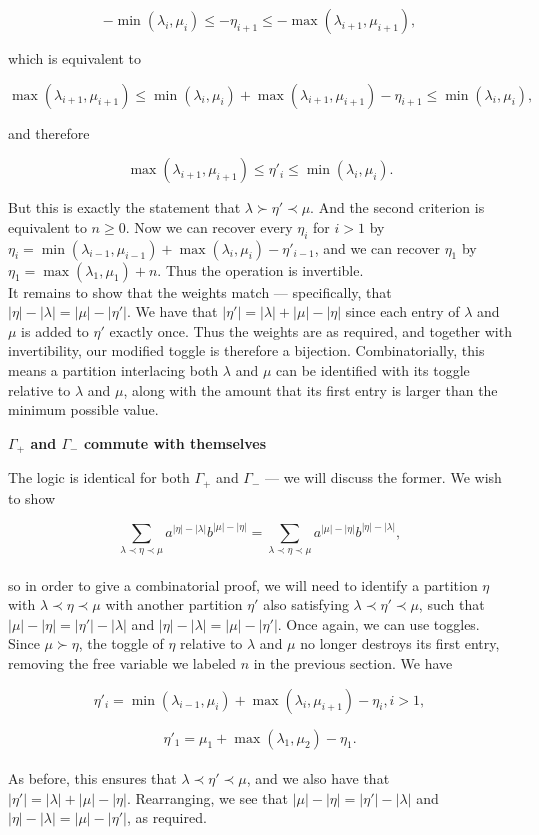 $$
	-\min(\lambda_i, \mu_i) \leq -\eta_{i + 1} \leq -\max(\lambda_{i + 1}, \mu_{i + 1}),
$$

which is equivalent to

$$
	\max(\lambda_{i + 1}, \mu_{i + 1}) \leq \min(\lambda_i, \mu_i) + \max(\lambda_{i + 1}, \mu_{i + 1}) - \eta_{i + 1} \leq \min(\lambda_i, \mu_i),
$$

and therefore

$$
	\max(\lambda_{i + 1}, \mu_{i + 1}) \leq \eta'_i \leq \min(\lambda_i, \mu_i).
$$

But this is exactly the statement that $\lambda \succ \eta' \prec \mu$. And the second criterion is equivalent to $n \geq 0$. Now we can recover every $\eta_i$ for $i > 1$ by $\eta_i = \min(\lambda_{i - 1}, \mu_{i - 1}) + \max(\lambda_i, \mu_i) - \eta'_{i - 1}$, and we can recover $\eta_1$ by $\eta_1 = \max(\lambda_1, \mu_1) + n$. Thus the operation is invertible.\\

It remains to show that the weights match --- specifically, that $|\eta| - |\lambda| = |\mu| - |\eta'|$. We have that $|\eta'| = |\lambda| + |\mu| - |\eta|$ since each entry of $\lambda$ and $\mu$ is added to $\eta'$ exactly once. Thus the weights are as required, and together with invertibility, our modified toggle is therefore a bijection. Combinatorially, this means a partition interlacing both $\lambda$ and $\mu$ can be identified with its toggle relative to $\lambda$ and $\mu$, along with the amount that its first entry is larger than the minimum possible value.

\vspace{.5in}

\large \textbf{$\Gamma_+$ and $\Gamma_-$ commute with themselves}

\vspace{.25in}

The logic is identical for both $\Gamma_+$ and $\Gamma_-$ --- we will discuss the former. We wish to show

$$
	\sum_{\lambda \prec \eta \prec \mu} a^{|\eta| - |\lambda|} b^{|\mu| - |\eta|} = \sum_{\lambda \prec \eta \prec \mu} a^{|\mu| - |\eta|} b^{|\eta| - |\lambda|},
$$
~\\
so in order to give a combinatorial proof, we will need to identify a partition $\eta$ with $\lambda \prec \eta \prec \mu$ with another partition $\eta'$ also satisfying $\lambda \prec \eta' \prec \mu$, such that $|\mu| - |\eta| = |\eta'| - |\lambda|$ and $|\eta| - |\lambda| = |\mu| - |\eta'|$. Once again, we can use toggles. Since $\mu \succ \eta$, the toggle of $\eta$ relative to $\lambda$ and $\mu$ no longer destroys its first entry, removing the free variable we labeled $n$ in the previous section. We have

$$
	\eta'_i = \min(\lambda_{i - 1}, \mu_i) + \max(\lambda_i, \mu_{i + 1}) - \eta_i, i > 1,
$$

$$
	\eta'_1 = \mu_1 + \max(\lambda_1, \mu_2) - \eta_1.
$$
~\\
As before, this ensures that $\lambda \prec \eta' \prec \mu$, and we also have that $|\eta'| = |\lambda| + |\mu| - |\eta|$. Rearranging, we see that $|\mu| - |\eta| = |\eta'| - |\lambda|$ and $|\eta| - |\lambda| = |\mu| - |\eta'|$, as required.

